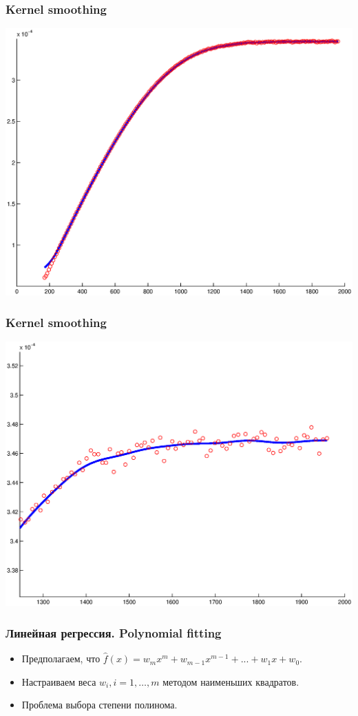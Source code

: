 \documentclass[smaller]{beamer}
\begin{document}
\begin{frame}
  \frametitle{Kernel smoothing}
   \includegraphics[scale=0.4]{kern_smooth.eps} 
   
\end{frame}

\begin{frame}
  \frametitle{Kernel smoothing}
\includegraphics[scale=0.4]{kern_smooth_b.eps}
\end{frame}

\begin{frame}
  \frametitle{Линейная регрессия. Polynomial fitting}
   \begin{itemize}
    \item Предполагаем, что $\hat{f}(x) = w_mx^m+w_{m-1}x^{m-1}+...+w_1x+w_0$.
    \item Настраиваем веса $w_i, i=1,\dots,m$ методом наименьших квадратов. 
    \item Проблема выбора степени полинома.
   \end{itemize}
\end{frame}
\end{document}
